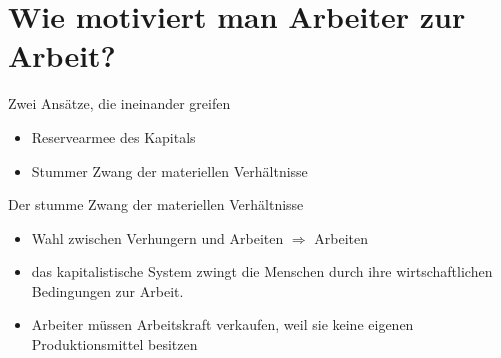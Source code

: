 \documentclass{beamer}
\begin{document}
\section{Wie motiviert man Arbeiter zur Arbeit?}
\begin{frame}{Zwei Ansätze, die ineinander greifen}
\begin{itemize}
 \item<1-> Reservearmee des Kapitals
 \item<2-> Stummer Zwang der materiellen Verhältnisse
\end{itemize}
\end{frame}
\begin{frame}{Der stumme Zwang der materiellen Verhältnisse}
\begin{itemize}
 \item Wahl zwischen Verhungern und Arbeiten  $\Rightarrow$ Arbeiten
 \item das kapitalistische System zwingt die Menschen durch ihre wirtschaftlichen Bedingungen zur Arbeit.
 \item Arbeiter müssen Arbeitskraft verkaufen, weil sie keine eigenen Produktionsmittel besitzen
\end{itemize}
\end{frame}
\end{document}
